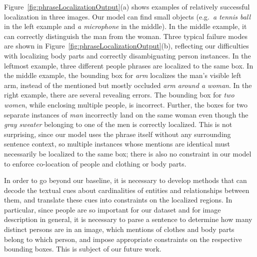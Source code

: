 \documentclass[twocolumn]{svjour3}
\begin{document}
\begin{figure*}
\centering
{}
	\caption{Example phrase localization results. For each image and reference sentence, phrases and top matching regions are shown in the same color. The matching score is given in brackets after each phrase (low scores are better). }
    \label{fig:phraseLocalizationOutput}
\end{figure*}


Figure~\ref{fig:phraseLocalizationOutput}(a) shows examples of relatively successful localization in three images. Our model can find small objects (e.g.\ \emph{a tennis ball} in the left example and \emph{a microphone} in the middle). In the middle example, it can correctly distinguish the man from the woman. Three typical failure modes are shown in Figure~\ref{fig:phraseLocalizationOutput}(b), reflecting our difficulties with localizing body parts and correctly disambiguating person instances. In the leftmost example, three different people phrases are localized to the same box. In the middle example, the bounding box for {\em arm} localizes the man's visible left arm, instead of the mentioned but mostly occluded {\em arm around a woman}. In the right example, there are several revealing errors. The bounding box for {\em two women}, while enclosing multiple people, is incorrect. Further, the boxes for two separate instances of {\em man} incorrectly land on the same woman even though the {\em gray sweater} belonging to one of the men is correctly localized. This is not surprising, since our model uses the phrase itself without any surrounding sentence context, so multiple instances whose mentions are identical must necessarily be localized to the same box; there is also no constraint in our model to enforce co-location of people and clothing or body parts. 





In order to go beyond our baseline, it is necessary to develop methods that can decode the textual cues about cardinalities of entities and relationships between them, and translate these cues into constraints on the localized regions. In particular, since people are so important for our dataset and for image description in general, it is necessary to parse a sentence to determine how many distinct persons are in an image, which mentions of clothes and body parts belong to which person, and impose appropriate constraints on the respective bounding boxes. This is subject of our future work.
\end{document}
